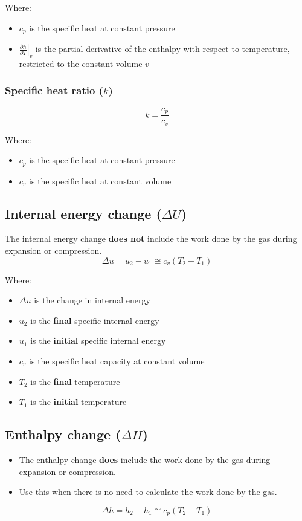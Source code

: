 \documentclass[11pt]{article}
\begin{document}
Where:
\begin{itemize}
\item \(c_p\) is the specific heat at constant pressure
\item \(\left. \frac{\partial h}{\partial T} \right|_v\) is the partial derivative of the enthalpy with respect to temperature, restricted to the constant volume \(v\)
\end{itemize}
\subsubsection{Specific heat ratio (\(k\))}
\label{sec:org8dbbe7a}
\[k = \frac{c_p}{c_v}\]

Where:
\begin{itemize}
\item \(c_p\) is the specific heat at constant pressure
\item \(c_v\) is the specific heat at constant volume
\end{itemize}
\subsection{Internal energy change (\(\Delta U\))}
\label{sec:org64b39c2}
The internal energy change \textbf{does not} include the work done by the gas during expansion or compression.
\[\Delta u = u_2 - u_1 \cong c_v \left(T_2 - T_1 \right)\]

Where:
\begin{itemize}
\item \(\Delta u\) is the change in internal energy
\item \(u_2\) is the \textbf{final} specific internal energy
\item \(u_1\) is the \textbf{initial} specific internal energy
\item \(c_v\) is the specific heat capacity at constant volume
\item \(T_2\) is the \textbf{final} temperature
\item \(T_1\) is the \textbf{initial} temperature
\end{itemize}

\newpage
\subsection{Enthalpy change (\(\Delta H\))}
\label{sec:org0e52bf9}
\begin{itemize}
\item The enthalpy change \textbf{does} include the work done by the gas during expansion or compression.
\item Use this when there is no need to calculate the work done by the gas.
\end{itemize}
\[\Delta h = h_2 - h_1 \cong c_p \left(T_2 - T_1 \right)\]
\end{document}
